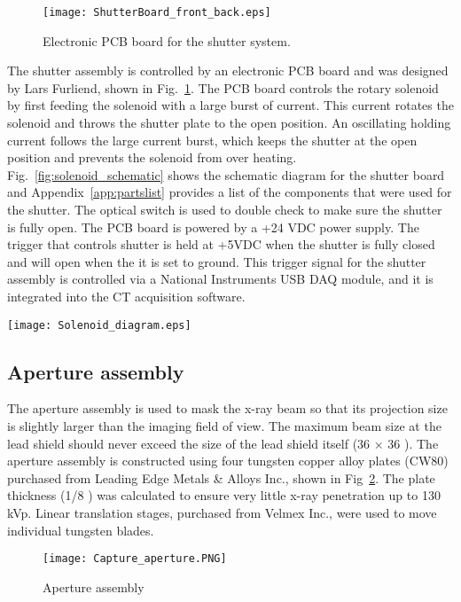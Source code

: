 \begin{figure}
\centering
\texttt{[image: ShutterBoard\_front\_back.eps]}
\caption{Electronic PCB board for the shutter system.}
\label{fig:shutterboard}
\end{figure}

The shutter assembly is controlled by an electronic PCB board and was designed by Lars Furliend, shown in Fig.~\ref{fig:shutterboard}.  The PCB board controls the rotary solenoid by first feeding the solenoid with a large burst of current.  This current rotates the solenoid and throws the shutter plate to the open position.  An oscillating holding current follows the large current burst, which keeps the shutter at the open position and prevents the solenoid from over heating.  Fig.~\ref{fig:solenoid_schematic} shows the schematic diagram for the shutter board and Appendix~\ref{app:partslist} provides a list of the components that were used for the shutter.  The optical switch is used to double check to make sure the shutter is fully open.  The PCB board is powered by a +24 VDC power supply.  The trigger that controls shutter is held at +5VDC when the shutter is fully closed and will open when the it is set to ground.  This trigger signal for the shutter assembly is controlled via a National Instruments USB DAQ module, and it is integrated into the CT acquisition software.
%
\begin{sidewaysfigure}[h]
\centering
\texttt{[image: Solenoid\_diagram.eps]}
\caption{Schematic for the solenoid PCB board}
\label{fig:solenoid_schematic}
\end{sidewaysfigure}
		
\subsection{Aperture assembly}
The aperture assembly is used to mask the x-ray beam so that its projection size is slightly larger than the imaging field of view.  The maximum beam size at the lead shield should never exceed the size of the lead shield itself (36 \inches $\times$ 36 \inches).  The aperture assembly is constructed using four tungsten copper alloy plates (CW80) purchased from Leading Edge Metals \& Alloys Inc., shown in Fig~\ref{fig:aperture}.  The plate thickness (1/8 \inches) was calculated to ensure very little x-ray penetration up to 130 kVp.  Linear translation stages, purchased from Velmex Inc., were used to move individual tungsten blades.
%
\begin{figure}[h]
\centering
\texttt{[image: Capture\_aperture.PNG]}
\caption{Aperture assembly}
\label{fig:aperture}
\end{figure}


